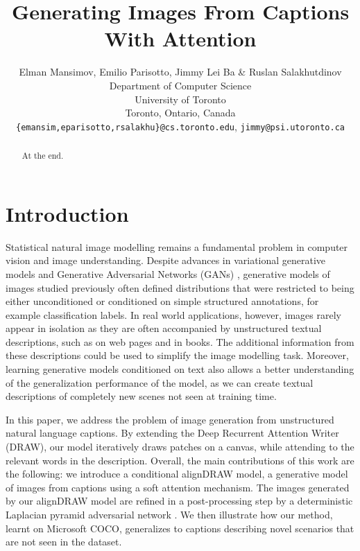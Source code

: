 \documentclass{article} %
\title{Generating Images From Captions\\ With Attention}
\author{
Elman Mansimov, Emilio Parisotto, Jimmy Lei Ba \& Ruslan Salakhutdinov\\
Department of Computer Science\\
University of Toronto\\
Toronto, Ontario, Canada \\
\texttt{\{emansim,eparisotto,rsalakhu\}@cs.toronto.edu}, \texttt{jimmy@psi.utoronto.ca}
}
\newcommand{\comm}[1]{}
\begin{document}
\maketitle

\begin{abstract}
At the end.
\end{abstract} 

\section{Introduction}
Statistical natural image modelling remains a fundamental problem in computer vision and image understanding.
Despite advances in variational generative models \cite{kingma_vae}\cite{gregor_draw} and Generative Adversarial Networks (GANs) \citep{goodfellow_gan}\cite{denton_lapgan}, 
generative models of images studied previously often defined distributions that were restricted to being either unconditioned or conditioned on simple structured annotations, for example classification labels.
In real world applications, however, images rarely appear in isolation as they are often accompanied by unstructured textual descriptions, such as on web pages and in books. 
The additional information from these descriptions could be used to simplify the image modelling task. Moreover, learning generative models conditioned on text also allows a better understanding of the generalization performance of the model, as we can create textual descriptions of completely new scenes not seen at training time. 

\comm{
Significant amount of recent works has been focused on generating captions from images \citep{karpathy_captions}, \citep{xu_captions}, \citep{kiros_captions} and etc. By contrast, image understanding may also be studied by generating images correctly interpreting the text description. 
Generating high dimensional realistic images from their descriptions is a more difficult approach that combines two challenging components of language modelling and image generation.  
}

In this paper, we address the problem of image generation from unstructured natural language captions. By extending the Deep Recurrent Attention Writer (DRAW)\cite{gregor_draw}, our model iteratively draws patches on a canvas, while attending to the relevant words in the description. Overall, the main contributions of this work are the following: we introduce a conditional alignDRAW model, a generative model of images from captions using a soft attention mechanism. The images generated by our alignDRAW model are refined in a post-processing step by a deterministic Laplacian pyramid adversarial network \cite{denton_lapgan}. We then illustrate how our method, learnt on Microsoft COCO, generalizes to captions describing novel scenarios that are not seen in the dataset.
\end{document}
